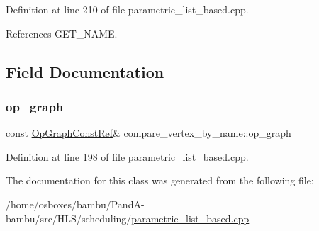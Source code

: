 Definition at line 210 of file parametric\+\_\+list\+\_\+based.\+cpp.



References G\+E\+T\+\_\+\+N\+A\+ME.



\subsection{Field Documentation}
\mbox{\label{classcompare__vertex__by__name_a16fa767f268ea728fa0f8567fa87f7ad}} 
\subsubsection{\texorpdfstring{op\+\_\+graph}{op\_graph}}
{\footnotesize\ttfamily const \hyperlink{op__graph_8hpp_a9a0b240622c47584bee6951a6f5de746}{Op\+Graph\+Const\+Ref}\& compare\+\_\+vertex\+\_\+by\+\_\+name\+::op\+\_\+graph\hspace{0.3cm}{\ttfamily [private]}}



Definition at line 198 of file parametric\+\_\+list\+\_\+based.\+cpp.



The documentation for this class was generated from the following file\+:\begin{DoxyCompactItemize}
\item 
/home/osboxes/bambu/\+Pand\+A-\/bambu/src/\+H\+L\+S/scheduling/\hyperlink{parametric__list__based_8cpp}{parametric\+\_\+list\+\_\+based.\+cpp}\end{DoxyCompactItemize}
